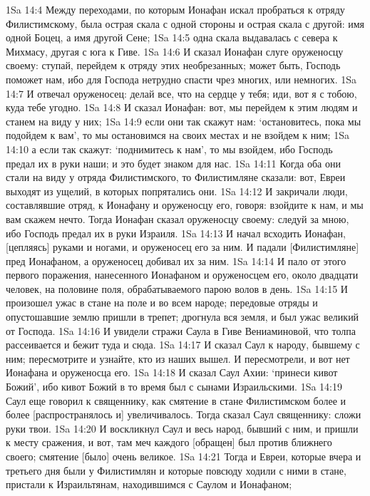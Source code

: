 1Sa 14:4  Между переходами, по которым Ионафан искал пробраться к отряду Филистимскому, была острая скала с одной стороны и острая скала с другой: имя одной Боцец, а имя другой Сене;
1Sa 14:5  одна скала выдавалась с севера к Михмасу, другая с юга к Гиве.
1Sa 14:6  И сказал Ионафан слуге оруженосцу своему: ступай, перейдем к отряду этих необрезанных; может быть, Господь поможет нам, ибо для Господа нетрудно спасти чрез многих, или немногих.
1Sa 14:7  И отвечал оруженосец: делай все, что на сердце у тебя; иди, вот я с тобою, куда тебе угодно.
1Sa 14:8  И сказал Ионафан: вот, мы перейдем к этим людям и станем на виду у них;
1Sa 14:9  если они так скажут нам: `остановитесь, пока мы подойдем к вам', то мы остановимся на своих местах и не взойдем к ним;
1Sa 14:10  а если так скажут: `поднимитесь к нам', то мы взойдем, ибо Господь предал их в руки наши; и это будет знаком для нас.
1Sa 14:11  Когда оба они стали на виду у отряда Филистимского, то Филистимляне сказали: вот, Евреи выходят из ущелий, в которых попрятались они.
1Sa 14:12  И закричали люди, составлявшие отряд, к Ионафану и оруженосцу его, говоря: взойдите к нам, и мы вам скажем нечто. Тогда Ионафан сказал оруженосцу своему: следуй за мною, ибо Господь предал их в руки Израиля.
1Sa 14:13  И начал всходить Ионафан, [цепляясь] руками и ногами, и оруженосец его за ним. И падали [Филистимляне] пред Ионафаном, а оруженосец добивал их за ним.
1Sa 14:14  И пало от этого первого поражения, нанесенного Ионафаном и оруженосцем его, около двадцати человек, на половине поля, обрабатываемого парою волов в день.
1Sa 14:15  И произошел ужас в стане на поле и во всем народе; передовые отряды и опустошавшие землю пришли в трепет; дрогнула вся земля, и был ужас великий от Господа.
1Sa 14:16  И увидели стражи Саула в Гиве Вениаминовой, что толпа рассеивается и бежит туда и сюда.
1Sa 14:17  И сказал Саул к народу, бывшему с ним; пересмотрите и узнайте, кто из наших вышел. И пересмотрели, и вот нет Ионафана и оруженосца его.
1Sa 14:18  И сказал Саул Ахии: `принеси кивот Божий', ибо кивот Божий в то время был с сынами Израильскими.
1Sa 14:19  Саул еще говорил к священнику, как смятение в стане Филистимском более и более [распространялось и] увеличивалось. Тогда сказал Саул священнику: сложи руки твои.
1Sa 14:20  И воскликнул Саул и весь народ, бывший с ним, и пришли к месту сражения, и вот, там меч каждого [обращен] был против ближнего своего; смятение [было] очень великое.
1Sa 14:21  Тогда и Евреи, которые вчера и третьего дня были у Филистимлян и которые повсюду ходили с ними в стане, пристали к Израильтянам, находившимся с Саулом и Ионафаном;
